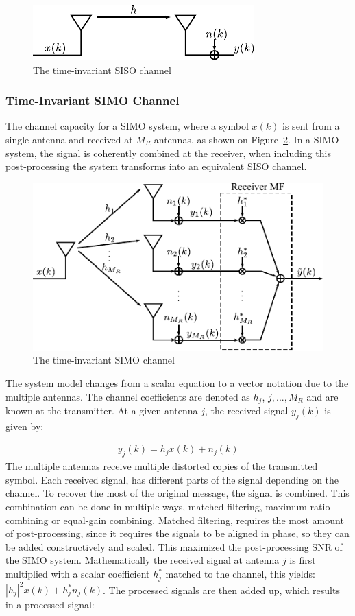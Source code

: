 \begin{figure}[hbp]
  \centering
  \includegraphics[scale=1.2]{img/analysis/sisoModel}
  \caption{The time-invariant SISO channel}
  \label{fig:sisoModel}
\end{figure}


\subsubsection{Time-Invariant SIMO Channel}
The channel capacity for a SIMO system, where a symbol $x(k)$ is sent from a single antenna and received at $M_R$ antennas, as shown on Figure~\ref{fig:simoModel}. In a SIMO system, the signal is coherently combined at the receiver, when including this post-processing the system transforms into an equivalent SISO channel. 
\begin{figure}[htbp]
  \centering
  \includegraphics[scale=1.2]{img/analysis/simoModel}
  \caption{The time-invariant SIMO channel}
  \label{fig:simoModel}
\end{figure}

The system model changes from a scalar equation to a vector notation due to the multiple antennas. The channel coefficients are denoted as $h_j$, $j,...,M_R$ and are known at the transmitter. At a given antenna $j$, the received signal $y_j(k)$ is given by: 

\begin{align*}
  y_j(k) = h_j x(k) + n_j(k)
\end{align*}
The multiple antennas receive multiple distorted copies of the transmitted symbol. Each received signal, has different parts of the signal depending on the channel. To recover the most of the original message, the signal is combined. This combination can be done in multiple ways, matched filtering, maximum ratio combining or equal-gain combining. Matched filtering, requires the most amount of post-processing, since it requires the signals to be aligned in phase, so they can be added constructively and scaled. This maximized the post-processing SNR of the SIMO system. Mathematically the received signal at antenna $j$ is first multiplied with a scalar coefficient $h_j^*$ matched to the channel, this yields: $|h_j|^2 x(k) + h_j^* n_j(k)$. The processed signals are then added up, which results in a processed signal: 

